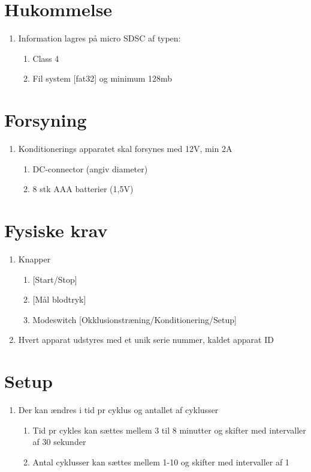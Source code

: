 	
	\section{Hukommelse}
	\begin{enumerate}
		\setlength\itemsep{0cm} %
		\item Information lagres på micro SDSC af typen:
		\begin{enumerate}
			\item Class 4
			\item Fil system [fat32] og minimum 128mb
		\end{enumerate}
	\end{enumerate}
	
	\section{Forsyning}
	\begin{enumerate}
		\setlength\itemsep{0cm} %
		\item Konditionerings apparatet skal forsynes med 12V, min 2A
		\begin{enumerate}
			\item DC-connector (angiv diameter) 
			\item 8 stk AAA batterier (1,5V)
		\end{enumerate}
	\end{enumerate}
	
	\section{Fysiske krav}
	\begin{enumerate}
		\setlength\itemsep{0cm} %
		\item Knapper
		\begin{enumerate}
			\item  {[}Start/Stop]
			\item {[}Mål blodtryk]
			\item Modeswitch [Okklusionstræning/Konditionering/Setup]
		\end{enumerate}
		\item Hvert apparat udstyres med et unik serie nummer, kaldet apparat ID
	\end{enumerate}
	
	\section{Setup}
	\begin{enumerate}
		\setlength\itemsep{0cm} %
		\item Der kan ændres i tid pr cyklus og antallet af cyklusser
		\begin{enumerate}
			\item Tid pr cykles kan sættes mellem 3 til 8 minutter og skifter med intervaller af 30 sekunder
			\item Antal cyklusser kan sættes mellem 1-10 og skifter med intervaller af 1
		\end{enumerate}
	\end{enumerate}